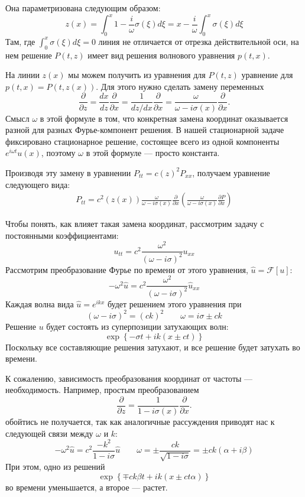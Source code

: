 \documentclass[12pt]{article}
\begin{document}
Она параметризована следующим образом:
\[
z(x) = \int_0^x 1 - \frac{i}{\omega}\sigma(\xi) d\xi = x - \frac{i}{\omega} \int_0^x \sigma(\xi) d\xi
\]
Там, где $\int_0^x\sigma(\xi)d\xi = 0$ линия не отличается от отрезка
действительной оси, на нем решение $P(t, z)$ имеет вид решения волнового уравнения $p(t,
x)$.

На линии $z(x)$ мы можем получить из уравнения для $P(t, z)$ уравнение для $p(t,
x) = P(t, z(x))$. Для этого нужно сделать замену переменных 
\[
\frac{\partial}{\partial z} = \frac{d x}{d z} \frac{\partial }{\partial x} = 
\frac{1}{dz/dx} \frac{\partial}{\partial x} = 
\frac{\omega}{\omega - i\sigma(x)} \frac{\partial}{\partial x}.
\]
Смысл $\omega$ в этой формуле в том, что конкретная замена координат оказывается
разной для разных Фурье-компонент решения. В нашей стационарной задаче
фиксировано стационарное решение, состоящее всего из одной компоненты
$e^{i\omega t}u(x)$, поэтому $\omega$ в этой формуле --- просто константа.

Производя эту замену в уравнении $P_{tt} = c(z)^2 P_{xx}$, получаем уравнение
следующего вида:
\begin{gather*}
P_{tt} = c^2(z(x)) 
\frac{\omega}{\omega - i\sigma(x)} 
\frac{\partial}{\partial x}
\left(
\frac{\omega}{\omega - i\sigma(x)} 
\frac{\partial P}{\partial x}
\right)
\end{gather*}

Чтобы понять, как влияет такая замена координат, рассмотрим задачу с постоянными
коэффициентами:
\[
u_{tt} = c^2 \frac{\omega^2}{(\omega - i\sigma)^2} u_{xx}
\]
Рассмотрим преобразование Фурье по времени от этого уравнения, $\hat u =
\mathcal{F}[u]$:
\[
-\omega^2 \hat u = c^2 \frac{\omega^2}{(\omega - i\sigma)^2} \hat{u}_{xx}
\]
Каждая волна вида $\hat u = e^{ikx}$ будет решением этого уравнения при
\[
(\omega - i\sigma)^2 = (ck)^2 \qquad \omega = i\sigma \pm ck
\]
Решение $u$ будет состоять из суперпозиции затухающих волн:
\[
\exp\left\{-\sigma t + ik(x \pm ct)\right\}
\]
Поскольку все составляющие решения затухают, и все решение будет затухать во
времени.

К сожалению, зависимость преобразования координат от частоты --- необходимость.
Например, простым преобразованием
\[
\frac{\partial}{\partial z} = 
\frac{1}{1 - i\sigma(x)} \frac{\partial}{\partial x}.
\]
обойтись не получается, так как аналогичные рассуждения приводят нас к следующей
связи между $\omega$ и $k$:
\[
-\omega^2 \hat u = c^2 \frac{-k^2}{1 - i\sigma} \hat u \qquad \omega = \pm
\frac{ck}{\sqrt{1 - i\sigma}} = \pm ck(\alpha + i\beta)
\]
При этом, одно из решений 
\[
\exp\left\{\mp ck\beta t + ik(x \pm ct\alpha)\right\}
\]
во времени уменьшается, а второе --- растет.
\end{document}
